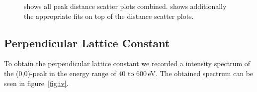 \documentclass[a4paper,10pt]{scrartcl}
\begin{document}
\begin{figure}
\centering
{}
\caption{ shows all peak distance scatter plots combined.  shows additionally the appropriate fits on top of the distance scatter plots.}
\end{figure}

\subsection{Perpendicular Lattice Constant}

To obtain the perpendicular lattice constant we recorded a intensity spectrum of the (0,0)-peak in the energy range of $40$ to $600\,$eV. The obtained spectrum can be seen in figure~\ref{fig:iv}.
\end{document}
